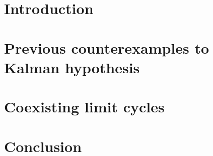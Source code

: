 \documentclass{ifacconf}
\theoremstyle{plain}
\begin{document}
\section{Introduction}
\section{Previous counterexamples to Kalman hypothesis}
\section{Coexisting limit cycles}
\section{Conclusion}
\end{document}

